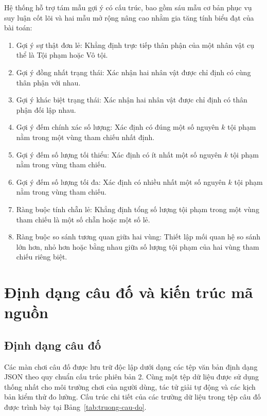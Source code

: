 Hệ thống hỗ trợ tám mẫu gợi ý có cấu trúc, bao gồm sáu mẫu cơ bản phục vụ suy luận cốt lõi và hai mẫu mở rộng nâng cao nhằm gia tăng tính biểu đạt của bài toán:
\begin{enumerate}
    \item Gợi ý sự thật đơn lẻ: Khẳng định trực tiếp thân phận của một nhân vật cụ thể là Tội phạm hoặc Vô tội.
    \item Gợi ý đồng nhất trạng thái: Xác nhận hai nhân vật được chỉ định có cùng thân phận với nhau.
    \item Gợi ý khác biệt trạng thái: Xác nhận hai nhân vật được chỉ định có thân phận đối lập nhau.
    \item Gợi ý đếm chính xác số lượng: Xác định có đúng một số nguyên $k$ tội phạm nằm trong một vùng tham chiếu nhất định.
    \item Gợi ý đếm số lượng tối thiểu: Xác định có ít nhất một số nguyên $k$ tội phạm nằm trong vùng tham chiếu.
    \item Gợi ý đếm số lượng tối đa: Xác định có nhiều nhất một số nguyên $k$ tội phạm nằm trong vùng tham chiếu.
    \item Ràng buộc tính chẵn lẻ: Khẳng định tổng số lượng tội phạm trong một vùng tham chiếu là một số chẵn hoặc một số lẻ.
    \item Ràng buộc so sánh tương quan giữa hai vùng: Thiết lập mối quan hệ so sánh lớn hơn, nhỏ hơn hoặc bằng nhau giữa số lượng tội phạm của hai vùng tham chiếu riêng biệt.
\end{enumerate}

\section{Định dạng câu đố và kiến trúc mã nguồn}
\label{sec:dinh-dang-kien-truc}

\subsection{Định dạng câu đố}
\label{subsec:dinh-dang-cau-do}

Các màn chơi câu đố được lưu trữ độc lập dưới dạng các tệp văn bản định dạng JSON theo quy chuẩn cấu trúc phiên bản 2. Cùng một tệp dữ liệu được sử dụng thống nhất cho môi trường chơi của người dùng, tác tử giải tự động và các kịch bản kiểm thử đo lường. Cấu trúc chi tiết của các trường dữ liệu trong tệp câu đố được trình bày tại Bảng~\ref{tab:truong-cau-do}.

